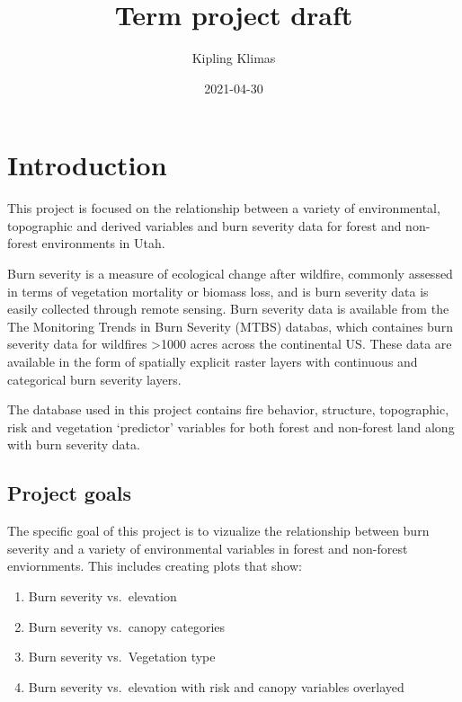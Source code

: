 \documentclass[]{book}
\title{Term project draft}
\author{Kipling Klimas}
\date{2021-04-30}
\providecommand{\tightlist}{%
  \setlength{\itemsep}{0pt}\setlength{\parskip}{0pt}}
\begin{document}
\maketitle

{
\setcounter{tocdepth}{1}
\tableofcontents
}
\hypertarget{introduction}{%
\chapter{Introduction}\label{introduction}}

This project is focused on the relationship between a variety of environmental, topographic and derived variables and burn severity data for forest and non-forest environments in Utah.

Burn severity is a measure of ecological change after wildfire, commonly assessed in terms of vegetation mortality or biomass loss,
and is burn severity data is easily collected through remote sensing. Burn severity data is available from the The Monitoring Trends in Burn Severity (MTBS) databas, which containes burn severity data for wildfires \textgreater{}1000 acres across the continental US.
These data are available in the form of spatially explicit raster layers with continuous and categorical burn severity layers.

The database used in this project contains fire behavior, structure, topographic, risk and vegetation `predictor' variables for both
forest and non-forest land along with burn severity data.

\hypertarget{project-goals}{%
\section{Project goals}\label{project-goals}}

The specific goal of this project is to vizualize the relationship between burn severity and a variety of environmental variables in forest and non-forest enviornments. This includes creating plots that show:

\begin{enumerate}
\def\labelenumi{\arabic{enumi}.}
\tightlist
\item
  Burn severity vs.~elevation
\item
  Burn severity vs.~canopy categories
\item
  Burn severity vs.~Vegetation type
\item
  Burn severity vs.~elevation with risk and canopy variables overlayed
\end{enumerate}
\end{document}
